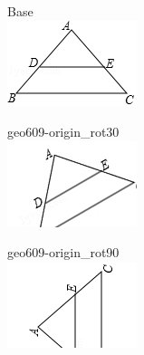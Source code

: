 \documentclass[12pt]{article}
\begin{document}
\begin{center}
\begin{minipage}{0.32\textwidth}\centering
Base\\
\includegraphics[width=0.95\linewidth]{out_rommath_origin/items/geo609-origin/assets/figure.png}
\end{minipage}
\hfill\begin{minipage}{0.32\textwidth}\centering
geo609-origin\_rot30\\
\includegraphics[width=0.95\linewidth]{out_rommath_origin/items/geo609-origin/assets/figure_rot30.png}
\end{minipage}
\hfill\begin{minipage}{0.32\textwidth}\centering
geo609-origin\_rot90\\
\includegraphics[width=0.95\linewidth]{out_rommath_origin/items/geo609-origin/assets/figure_rot90.png}

\end{minipage}
\end{center}
\end{document}
